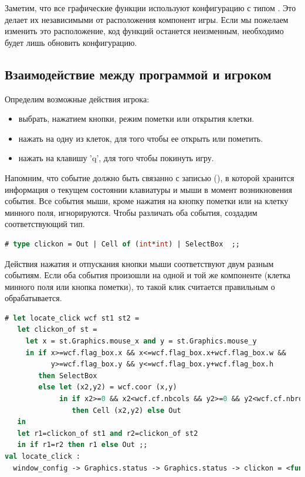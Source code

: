 Заметим, что все графические функции используют конфигурацию с типом
. Это делает их независимыми от расположения компонент 
игры. Если мы пожелаем изменить это расположение, код функций останется 
неизменным, необходимо будет лишь обновить конфигурацию.

\subsection{Взаимодействие между программой и игроком}
\label{subsec:interaction_with_the_player}

Определим возможные действия игрока:

\begin{itemize}
	\item выбрать, нажатием кнопки, режим пометки или открытия клетки. 

	\item нажать на одну из клеток, для того чтобы ее открыть или пометить. 

	\item нажать на клавишу 'q', для того чтобы покинуть игру. 
\end{itemize}

Напомним, что событие  должно быть связанно с записью 
(), в которой хранится информация о текущем состоянии 
клавиатуры и мыши в момент возникновения события. Все события мыши, кроме 
нажатия на кнопку пометки или на клетку минного поля, игнорируются. Чтобы 
различать оба события, создадим соответствующий тип.

\begin{lstlisting}[language=OCaml]
# type clickon = Out | Cell of (int*int) | SelectBox  ;;
\end{lstlisting}

Действия нажатия и отпускания кнопки мыши соответствуют двум разным событиям. 
Если оба события произошли на одной и той же компоненте (клетка минного поля или 
кнопка пометки), то такой клик считается правильным о обрабатывается.

\begin{lstlisting}[language=OCaml]
# let locate_click wcf st1 st2 =
   let clickon_of st = 
     let x = st.Graphics.mouse_x and y = st.Graphics.mouse_y
     in if x>=wcf.flag_box.x && x<=wcf.flag_box.x+wcf.flag_box.w && 
           y>=wcf.flag_box.y && y<=wcf.flag_box.y+wcf.flag_box.h  
        then SelectBox
        else let (x2,y2) = wcf.coor (x,y)
             in if x2>=0 && x2<wcf.cf.nbcols && y2>=0 && y2<wcf.cf.nbrows
                then Cell (x2,y2) else Out
   in 
   let r1=clickon_of st1 and r2=clickon_of st2
   in if r1=r2 then r1 else Out ;;
val locate_click :
  window_config -> Graphics.status -> Graphics.status -> clickon = <fun>
\end{lstlisting}


